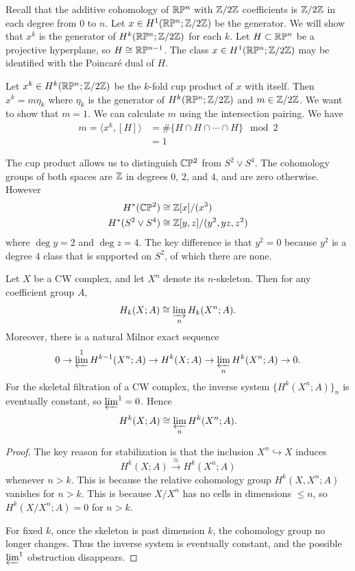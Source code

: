 \documentclass[12pt]{article}
\begin{document}
\begin{example}
    Recall that the additive cohomology of $\mathbb{R}\mathbb{P}^n$ with $\mathbb{Z}/2\mathbb{Z}$ coefficients is $\mathbb{Z}/2\mathbb{Z}$ in each degree from $0$ to $n$. Let $x\in H^1(\mathbb{R}\mathbb{P}^n;\mathbb{Z}/2\mathbb{Z})$ be the generator. We will show that $x^k$ is the generator of $H^k(\mathbb{R}\mathbb{P}^n;\mathbb{Z}/2\mathbb{Z})$ for each $k$. Let $H\subset \mathbb{R}\mathbb{P}^n$ be a projective hyperplane, so $H\cong \mathbb{R}\mathbb{P}^{n-1}$. The class $x\in H^1(\mathbb{R}\mathbb{P}^n;\mathbb{Z}/2\mathbb{Z})$ may be identified with the Poincaré dual of $H$. 

    Let $x^k\in H^k(\mathbb{R}\mathbb{P}^n;\mathbb{Z}/2\mathbb{Z})$ be the $k$-fold cup product of $x$ with itself. Then $x^k = m\eta_k$ where $\eta_k$ is the generator of $H^k(\mathbb{R}\mathbb{P}^n;\mathbb{Z}/2\mathbb{Z})$ and $m\in \mathbb{Z}/2\mathbb{Z}$. We want to show that $m=1$. We can calculate $m$ using the intersection pairing. We have \begin{align*}
        m = \langle x^k, [H]\rangle & = \#\{H\cap H\cap \cdots \cap H\} \mod 2 \\
        & = 1
    \end{align*}
\end{example}

\begin{example}
    The cup product allows us to distinguish $\mathbb{C}\mathbb{P}^2$ from $S^2 \vee S^4$. The cohomology groups of both spaces are $\mathbb{Z}$ in degrees $0$, $2$, and $4$, and are zero otherwise. However \begin{align*}
    H^*(\mathbb{C}\mathbb{P}^2) & \cong \mathbb{Z}[x]/(x^3) \\
    H^*(S^2 \vee S^4) & \cong \mathbb{Z} [y,z]/(y^2,yz,z^2)
    \end{align*} where $\deg y = 2$ and $\deg z = 4$. The key difference is that $y^2 = 0$ because $y^2$ is a degree $4$ class that is supported on $S^2$, of which there are none.
\end{example}

\begin{theorem}
Let $X$ be a CW complex, and let $X^n$ denote its $n$-skeleton. Then for any coefficient group $A$,
\[
H_k(X;A)\cong \varinjlim_n H_k(X^n;A).
\]
Moreover, there is a natural Milnor exact sequence
\[
0\to \varprojlim^1 H^{k-1}(X^n;A)
\to H^k(X;A)
\to \varprojlim_n H^k(X^n;A)
\to 0.
\]
For the skeletal filtration of a CW complex, the inverse system $\{H^k(X^n;A)\}_n$ is eventually constant, so $\varprojlim^1=0$. Hence
\[
H^k(X;A)\cong \varprojlim_n H^k(X^n;A).
\]
\end{theorem}

\begin{proof}
    The key reason for stabilization is that the inclusion $X^n\hookrightarrow X$ induces \[ H^k(X;A)\xrightarrow{\cong} H^k(X^n;A) \] whenever $n>k$. This is because the relative cohomology group $H^k(X,X^n;A)$ vanishes for $n>k$. This is because $X/X^n$ has no cells in dimensions $\le n$, so $H^k(X/X^n;A)=0$ for $n>k$.

For fixed $k$, once the skeleton is past dimension $k$, the cohomology group no longer changes. Thus the inverse system is eventually constant, and the possible $\varprojlim^1$ obstruction disappears.
\end{proof}
\end{document}
